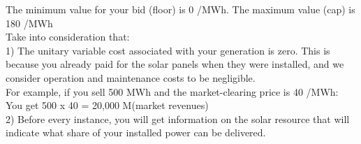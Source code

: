 \documentclass[3p]{elsarticle} %
\begin{document}
The minimum value for your bid (floor) is 0 \EUR/MWh. The maximum value (cap) is 180 \EUR/MWh \\

Take into consideration that: \\

1)	The unitary variable cost associated with your generation is zero. This is because you already paid for the solar panels when they were installed, and we consider operation and maintenance costs to be negligible. \\

For example, if you sell 500 MWh and the market-clearing price is 40 \EUR/MWh:\\
You get 500 x 40 = 20,000 M\EUR (market revenues)\\

2)	Before every instance, you will get information on the solar resource that will indicate what share of your installed power can be delivered.
\end{document}
